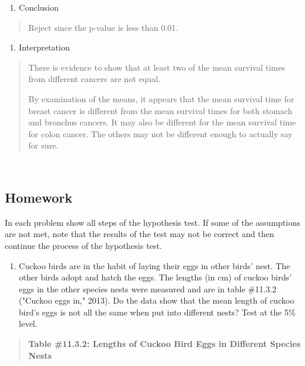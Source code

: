\documentclass[]{book}
\providecommand{\tightlist}{%
  \setlength{\itemsep}{0pt}\setlength{\parskip}{0pt}}
\begin{document}
\begin{enumerate}
\def\labelenumi{\arabic{enumi}.}
\setcounter{enumi}{4}
\tightlist
\item
  Conclusion
\end{enumerate}

\begin{quote}
Reject since the p-value is less than 0.01.
\end{quote}

\begin{enumerate}
\def\labelenumi{\arabic{enumi}.}
\setcounter{enumi}{5}
\tightlist
\item
  Interpretation
\end{enumerate}

\begin{quote}
There is evidence to show that at least two of the mean survival times from different cancers are not equal.

By examination of the means, it appears that the mean survival time for breast cancer is different from the mean survival times for both stomach and bronchus cancers. It may also be different for the mean survival time for colon cancer. The others may not be different enough to actually say for sure.
\end{quote}

\textbf{\\
}

\hypertarget{homework-34}{%
\subsection{Homework}\label{homework-34}}

In each problem show all steps of the hypothesis test. If some of the assumptions are not met, note that the results of the test may not be correct and then continue the process of the hypothesis test.

\begin{enumerate}
\def\labelenumi{\arabic{enumi}.}
\tightlist
\item
  Cuckoo birds are in the habit of laying their eggs in other birds' nest. The other birds adopt and hatch the eggs. The lengths (in cm) of cuckoo birds' eggs in the other species nests were measured and are in table \#11.3.2 ("Cuckoo eggs in," 2013). Do the data show that the mean length of cuckoo bird's eggs is not all the same when put into different nests? Test at the 5\% level.
\end{enumerate}

\begin{quote}
\textbf{Table \#11.3.2: Lengths of Cuckoo Bird Eggs in Different Species
Nests}
\end{quote}
\end{document}
